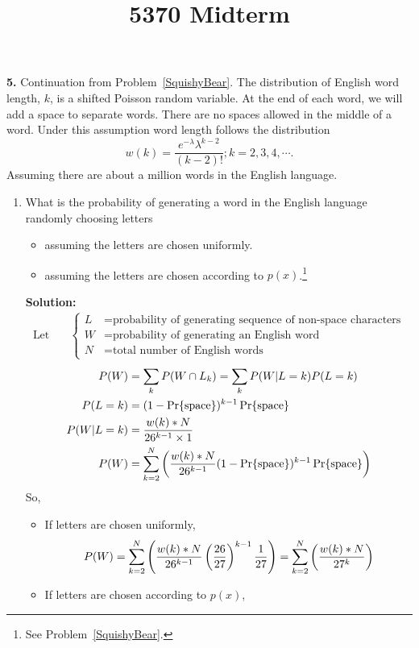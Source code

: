 \documentclass{assignment}
\begin{document}
\title{5370 Midterm}


\textbf{5.} \label{NewToyYoda}
Continuation from Problem~\ref{SquishyBear}.
The distribution of English word length, $k$, is a shifted Poisson random variable. At the end of each word, we will add a space to separate words. There are no spaces allowed in the middle of a word. Under this assumption word length follows the distribution
$$ w(k)=\frac{e^{-\lambda}\lambda^{k-2} }{(k-2)!} ; k=2,3,4,\cdots.$$
Assuming there are about a million words in the English language.
\begin{enumerate}
\item What is the probability of generating a word in the English language randomly choosing letters
  \begin{itemize}
  \item assuming the letters are chosen uniformly.
  \item assuming the letters are chosen according to $p(x)$.\footnote{See Problem~\ref{SquishyBear}.}
  \end{itemize}
  \textbf{Solution:} \\
  \begin{align*}
    \text{Let} \quad & \begin{cases}
      L & = \text{probability of generating sequence of non-space characters} \\
      W & = \text{probability of generating an English word} \\
      N & = \text{total number of English words}
    \end{cases}
  \end{align*}
  \begin{align*}
    P(W) & = \sum_k P(W \cap L_k) = \sum_k P(W|L=k)P(L=k) \\
    P(L=k) & = (1 - \Pr\{\text{space}\})^{k-1}\Pr\{\text{space}\}\\
    P(W|L=k) & = \dfrac{w(k) * N}{26^{k-1}\times 1} \\
    P(W) & = \sum_{k=2}^{N} \left(\dfrac{w(k) * N}{26^{k-1}} (1 - \Pr\{\text{space}\})^{k-1}\Pr\{\text{space}\}\right)
  \end{align*}
  So,
  \begin{itemize}
    \item If letters are chosen uniformly,
      $$P(W) = \sum_{k=2}^{N} \left(\dfrac{w(k) * N}{26^{k-1}} \left(\dfrac{26}{27}\right)^{k-1}\dfrac{1}{27}\right)
      = \sum_{k=2}^{N} \left(\dfrac{w(k) * N}{27^{k}} \right)$$
    \item If letters are chosen according to $p(x)$,

\end{itemize}
\end{enumerate}
\end{document}
